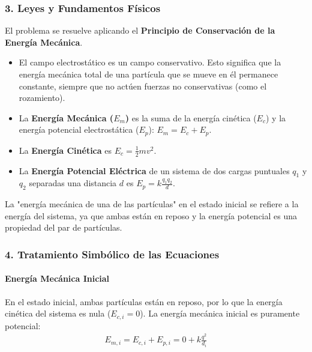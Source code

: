 \subsubsection*{3. Leyes y Fundamentos Físicos}
El problema se resuelve aplicando el \textbf{Principio de Conservación de la Energía Mecánica}.
\begin{itemize}
    \item El campo electrostático es un campo conservativo. Esto significa que la energía mecánica total de una partícula que se mueve en él permanece constante, siempre que no actúen fuerzas no conservativas (como el rozamiento).
    \item La \textbf{Energía Mecánica ($E_m$)} es la suma de la energía cinética ($E_c$) y la energía potencial electrostática ($E_p$): $E_m = E_c + E_p$.
    \item La \textbf{Energía Cinética} es $E_c = \frac{1}{2}mv^2$.
    \item La \textbf{Energía Potencial Eléctrica} de un sistema de dos cargas puntuales $q_1$ y $q_2$ separadas una distancia $d$ es $E_p = k \frac{q_1 q_2}{d}$.
\end{itemize}
La "energía mecánica de una de las partículas" en el estado inicial se refiere a la energía del sistema, ya que ambas están en reposo y la energía potencial es una propiedad del par de partículas.

\subsubsection*{4. Tratamiento Simbólico de las Ecuaciones}
\paragraph*{Energía Mecánica Inicial}
En el estado inicial, ambas partículas están en reposo, por lo que la energía cinética del sistema es nula ($E_{c,i} = 0$). La energía mecánica inicial es puramente potencial:
\begin{gather}
    E_{m,i} = E_{c,i} + E_{p,i} = 0 + k \frac{q^2}{d_i}
\end{gather}
